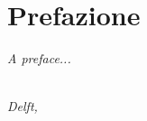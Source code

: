 \chapter*{Prefazione}

\emph{A preface...}

\begin{flushright}
{\makeatletter\itshape
    \@author \\
    Delft, \monthname{} \the\year{}
\makeatother}
\end{flushright}
